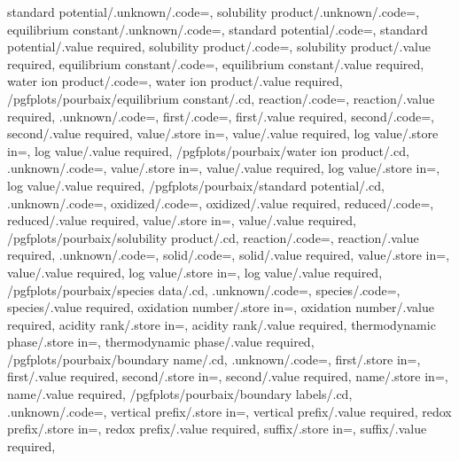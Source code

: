 {  standard potential/.unknown/.code={\luapourbaixaddressdispatch{}},
  solubility product/.unknown/.code={\luapourbaixaddressdispatch{}},
  equilibrium constant/.unknown/.code={\luapourbaixaddressdispatch{}},
  standard potential/.code={},
  standard potential/.value required,
  solubility product/.code={},
  solubility product/.value required,
  equilibrium constant/.code={},
  equilibrium constant/.value required,
  water ion product/.code={},
  water ion product/.value required,
  /pgfplots/pourbaix/equilibrium constant/.cd,
  reaction/.code={\def\luapourbaixreaction{#1}\def\luapourbaixhasreaction{1}},
  reaction/.value required,
  .unknown/.code={\luapourbaixunknown},
  first/.code={\luapourbaixsetidentity{}},
  first/.value required,
  second/.code={\luapourbaixsetidentity{}},
  second/.value required,
  value/.store in=\luapourbaixvalue,
  value/.value required,
  log value/.store in=\luapourbaixlogvalue,
  log value/.value required,
  /pgfplots/pourbaix/water ion product/.cd,
  .unknown/.code={\luapourbaixunknown},
  value/.store in=\luapourbaixvalue,
  value/.value required,
  log value/.store in=\luapourbaixlogvalue,
  log value/.value required,
  /pgfplots/pourbaix/standard potential/.cd,
  .unknown/.code={\luapourbaixunknown},
  oxidized/.code={\luapourbaixsetidentity{}},
  oxidized/.value required,
  reduced/.code={\luapourbaixsetidentity{}},
  reduced/.value required,
  value/.store in=\luapourbaixvalue,
  value/.value required,
  /pgfplots/pourbaix/solubility product/.cd,
  reaction/.code={\def\luapourbaixreaction{#1}\def\luapourbaixhasreaction{1}},
  reaction/.value required,
  .unknown/.code={\luapourbaixunknown},
  solid/.code={\luapourbaixsetidentity{}},
  solid/.value required,
  value/.store in=\luapourbaixvalue,
  value/.value required,
  log value/.store in=\luapourbaixlogvalue,
  log value/.value required,
  /pgfplots/pourbaix/species data/.cd,
  .unknown/.code={\luapourbaixunknown},
  species/.code={\luapourbaixsetidentity{}},
  species/.value required,
  oxidation number/.store in=\luapourbaixoxidation,
  oxidation number/.value required,
  acidity rank/.store in=\luapourbaixacidityrank,
  acidity rank/.value required,
  thermodynamic phase/.store in=\luapourbaixphase,
  thermodynamic phase/.value required,
  /pgfplots/pourbaix/boundary name/.cd,
  .unknown/.code={\luapourbaixunknown},
  first/.store in=\luapourbaixfirst,
  first/.value required,
  second/.store in=\luapourbaixsecond,
  second/.value required,
  name/.store in=\luapourbaixboundaryname,
  name/.value required,
  /pgfplots/pourbaix/boundary labels/.cd,
  .unknown/.code={\luapourbaixunknown},
  vertical prefix/.store in=\luapourbaixverticalprefix,
  vertical prefix/.value required,
  redox prefix/.store in=\luapourbaixredoxprefix,
  redox prefix/.value required,
  suffix/.store in=\luapourbaixboundarysuffix,
  suffix/.value required,
}
